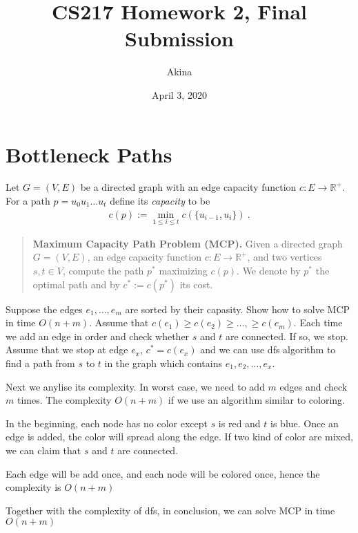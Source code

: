 \documentclass[11pt,a4paper,oneside]{article}
\newcommand{\R}{\mathbb{R}}
\renewcommand{\hwtitle} {CS217 Homework 2, Final Submission}
\renewcommand{\hwauthor}{Akina}
\renewcommand{\hwdate}{April 3, 2020}
\begin{document}
\title{\hwtitle}
\author{\hwauthor}
\date{\hwdate}
\maketitle

\section*{Bottleneck Paths}

Let $G=(V,E)$ be a directed graph with an edge capacity function $c: E \rightarrow \R^+$. For a path
$p = u_0 u_1 \dots u_t$ define its {\em capacity} to be
\begin{align}
c(p) := \min_{1 \leq i \leq t} c( \{u_{i-1}, u_i\}) \ .
\end{align}

\begin{quotation}
	\textbf{Maximum Capacity Path Problem (MCP).} Given a directed graph $G = (V,E)$, an edge capacity function
	$c: E \rightarrow \R^+$, and two vertices $s, t \in V$, compute the path $p^*$ maximizing $c(p)$. We
	denote by $p^*$ the optimal path and by $c^* := c(p^*)$ its cost. 
\end{quotation}

\begin{problem}{1}
	\statement
	Suppose the edges $e_1,\dots,e_m$ are sorted by their capasity. Show how to solve MCP in time $O(n+m)$.
	\solution
	Assume that \(c(e_1) \geq c(e_2) \geq \dots, \geq c(e_m)\). Each time we add an edge in order and check whether \(s\) and \(t\) are connected. If so, we stop. Assume that we stop at edge \(e_x\), \(c^* = c(e_x)\) and we can use dfs algorithm to find a path from \(s\) to \(t\) in the graph which contains \(e_1, e_2, \dots, e_x\).
	
	Next we anylise its complexity. In worst case, we need to add \(m\) edges and check \(m\) times. The complexity \(O(n + m)\) if we use an algorithm similar to coloring. 
	
	In the beginning, each node has no color except \(s\) is red and \(t\) is blue. Once an edge is added, the color will spread along the edge. If two kind of color are mixed, we can claim that \(s\) and \(t\) are connected.
	
	Each edge will be add once, and each node will be colored once, hence the complexity is \(O(n + m)\)
	
	Together with the complexity of dfs, in conclusion, we can solve MCP in time \(O(n + m)\)
\end{problem}
\end{document}

